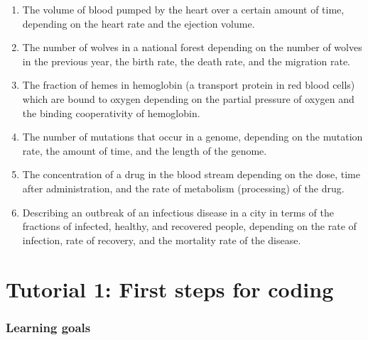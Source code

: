 \documentclass[
  letterpaper,
  DIV=11,
  numbers=noendperiod]{scrreprt}
\begin{document}
\begin{enumerate}
\def\labelenumi{\arabic{enumi}.}
\item
  The volume of blood pumped by the heart over a certain amount of time,
  depending on the heart rate and the ejection volume.
\item
  The number of wolves in a national forest depending on the number of
  wolves in the previous year, the birth rate, the death rate, and the
  migration rate.
\item
  The fraction of hemes in hemoglobin (a transport protein in red blood
  cells) which are bound to oxygen depending on the partial pressure of
  oxygen and the binding cooperativity of hemoglobin.
\item
  The number of mutations that occur in a genome, depending on the
  mutation rate, the amount of time, and the length of the genome.
\item
  The concentration of a drug in the blood stream depending on the dose,
  time after administration, and the rate of metabolism (processing) of
  the drug.
\item
  Describing an outbreak of an infectious disease in a city in terms of
  the fractions of infected, healthy, and recovered people, depending on
  the rate of infection, rate of recovery, and the mortality rate of the
  disease.
\end{enumerate}

\hypertarget{section}{%
\section{}\label{section}}


\hypertarget{tutorial-1-first-steps-for-coding}{%
\chapter*{Tutorial 1: First steps for
coding}\label{tutorial-1-first-steps-for-coding}}


\hypertarget{learning-goals}{%
\subsection*{Learning goals}\label{learning-goals}}
\end{document}
